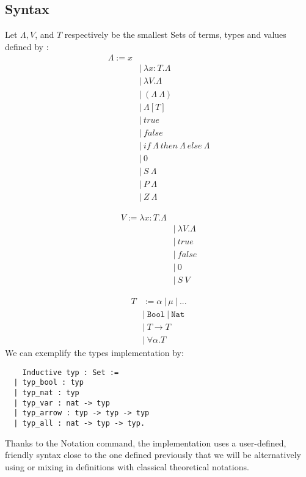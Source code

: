 \documentclass{article}
\begin{document}
    \subsection{Syntax}\label{syntax}
    Let $\Lambda,  V$, and $T$ respectively be the smallest Sets of terms, types and values defined by :
    \begin{align}
        \Lambda := x \tag{variable}\\     
      &|\ \lambda x : T.\Lambda \tag{term abstraction}\\
      &|\ \lambda V.\Lambda \tag{type abstraction}\\
      &|\ (\Lambda \ \Lambda) \tag{term application}\\
      &|\ \Lambda[ T ] \tag{type application}\\
      &|\ true \tag{true}\\
      &|\ false \tag{false}\\
      &|\ if \ \Lambda \  then \  \Lambda \  else \  \Lambda \tag{If then else}\\
      &|\ 0 \tag{Zero}\\
      &|\ S \ \Lambda \tag{Successor}\\
      &|\ P \ \Lambda \tag{Predecessor}\\
      &|\ Z \ \Lambda \tag{Zero predicate}
    \end{align}

    \begin{align}
        V :=  \lambda x : T.\Lambda \tag{term abstraction}\\
    &|\ \lambda V.\Lambda \tag{type abstraction}\\
    &|\ true \tag{Boolean value : true}\\
    &|\ false \tag{Boolean value : false}\\
    &|\ 0 \tag{Natural value : Zero}\\
    &|\ S \ V \tag{Natural value : Non-zero natural number}
    \end{align}

    \begin{align}
        T &:= \alpha \ | \ \mu \ | \  ... \tag{Type variables}\\
        &| \ \texttt{Bool} \ | \ \texttt{Nat} \tag{Base types} \\
        &| \ T\rightarrow T \tag{Arrow types}\\
        &| \ \forall \alpha.T \tag{Quantified types}
    \end{align}
We can exemplify the types implementation by:\begin{verbatim}
    Inductive typ : Set :=
  | typ_bool : typ
  | typ_nat : typ
  | typ_var : nat -> typ
  | typ_arrow : typ -> typ -> typ
  | typ_all : nat -> typ -> typ.
\end{verbatim}
Thanks to the Notation command, the implementation uses a user-defined, friendly syntax close to the one defined previously that we will be alternatively using or mixing in definitions with classical theoretical notations.
\end{document}
